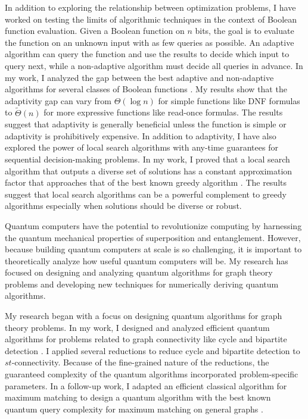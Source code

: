 \documentclass[11pt]{article}
\begin{document}
In addition to exploring the relationship between optimization problems, I have worked on testing the limits of algorithmic techniques in the context of Boolean function evaluation.
Given a Boolean function on $n$ bits, the goal is to evaluate the function on an unknown input with as few queries as possible.
An adaptive algorithm can query the function and use the results to decide which input to query next, while a non-adaptive algorithm must decide all queries in advance.
In my work, I analyzed the gap between the best adaptive and non-adaptive algorithms for several classes of Boolean functions \cite{hellerstein2022adaptivity}.
My results show that the adaptivity gap can vary from $\Theta(\log n)$ for simple functions like DNF formulas to $\tilde{\Theta}(n)$ for more expressive functions like read-once formulas.
The results suggest that adaptivity is generally beneficial unless the function is simple or adaptivity is prohibitively expensive.
In addition to adaptivity, I have also explored the power of local search algorithms with any-time guarantees for sequential decision-making problems.
In my work, I proved that a local search algorithm that outputs a diverse set of solutions has a constant approximation factor that approaches that of the best known greedy algorithm \cite{hellerstein2022local}.
The results suggest that local search algorithms can be a powerful complement to greedy algorithms especially when solutions should be diverse or robust.

Quantum computers have the potential to revolutionize computing by harnessing the quantum mechanical properties of superposition and entanglement.
However, because building quantum computers at scale is so challenging, it is important to theoretically analyze how useful quantum computers will be.
My research has focused on designing and analyzing quantum algorithms for graph theory problems and developing new techniques for numerically deriving quantum algorithms.

My research began with a focus on designing quantum algorithms for graph theory problems.
In my work, I designed and analyzed efficient quantum algorithms for problems related to graph connectivity like cycle and bipartite detection \cite{delorenzo2019applications}.
I applied several reductions to reduce cycle and bipartite detection to $st$-connectivity.
Because of the fine-grained nature of the reductions, the guaranteed complexity of the quantum algorithms incorporated problem-specific parameters.
In a follow-up work, I adapted an efficient classical algorithm for maximum matching to design a quantum algorithm with the best known quantum query complexity for maximum matching on general graphs \cite{kimmel2021query}.
\end{document}

